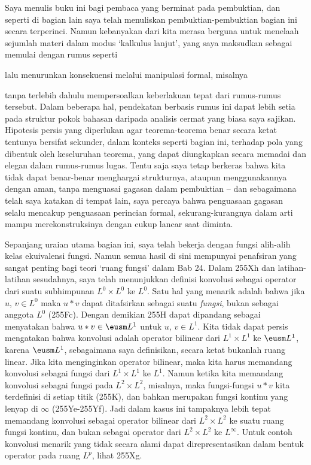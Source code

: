 {Saya menulis buku ini bagi pembaca yang berminat pada pembuktian, dan seperti
di bagian lain saya telah menuliskan pembuktian-pembuktian bagian ini secara terperinci.   Namun
kebanyakan dari kita merasa berguna untuk menelaah sejumlah
materi dalam modus `kalkulus lanjut', yang saya maksudkan sebagai memulai dengan
rumus seperti


\noindent lalu menurunkan konsekuensi melalui manipulasi formal,
misalnya


\noindent tanpa terlebih dahulu mempersoalkan keberlakuan tepat dari
rumus-rumus tersebut.   Dalam beberapa hal, pendekatan berbasis rumus ini dapat
lebih setia pada struktur pokok bahasan daripada analisis cermat yang
biasa saya sajikan.   Hipotesis persis yang diperlukan agar teorema-teorema
benar secara ketat tentunya bersifat sekunder, dalam konteks seperti
bagian ini, terhadap pola yang dibentuk oleh keseluruhan teorema,
yang dapat diungkapkan secara memadai dan elegan dalam rumus-rumus
lugas.   Tentu saja saya tetap berkeras bahwa kita tidak dapat benar-benar
menghargai strukturnya, ataupun menggunakannya dengan aman, tanpa menguasai gagasan
dalam pembuktian -- dan sebagaimana telah saya katakan di tempat lain, saya percaya bahwa penguasaan
gagasan selalu mencakup penguasaan perincian formal, sekurang-kurangnya dalam arti
mampu merekonstruksinya dengan cukup lancar
saat diminta.

Sepanjang uraian utama bagian ini, saya telah bekerja dengan
fungsi alih-alih kelas ekuivalensi fungsi.    Namun semua
hasil di sini mempunyai penafsiran yang sangat penting bagi teori
`ruang fungsi' dalam Bab 24.   Dalam 255Xh dan latihan-latihan
sesudahnya, saya telah menunjukkan definisi konvolusi sebagai operator
dari suatu subhimpunan $L^0\times L^0$ ke $L^0$.
Satu hal yang menarik
adalah bahwa jika $u$, $v\in L^0$ maka $u*v$ dapat ditafsirkan sebagai
suatu {\it fungsi}, bukan sebagai anggota $L^0$ (255Fc).
Dengan demikian 255H dapat dipandang sebagai menyatakan bahwa $u*v\in\eusm L^1$
untuk $u$, $v\in L^1$.   Kita tidak dapat persis mengatakan bahwa konvolusi adalah
operator bilinear dari $L^1\times L^1$ ke $\eusm L^1$, karena $\eusm L^1$,
sebagaimana saya definisikan,
secara ketat bukanlah ruang linear.   Jika kita menginginkan operator bilinear,
maka kita harus memandang konvolusi sebagai fungsi dari
$L^1\times L^1$ ke $L^1$.   Namun ketika kita memandang konvolusi sebagai
fungsi pada $L^2\times L^2$, misalnya, maka fungsi-fungsi $u*v$ kita
terdefinisi di setiap titik (255K), dan bahkan merupakan fungsi kontinu yang lenyap
di $\infty$ (255Ye-255Yf).   Jadi dalam kasus ini tampaknya lebih tepat
memandang konvolusi sebagai operator bilinear dari $L^2\times L^2$ ke
suatu ruang fungsi kontinu, dan bukan sebagai operator dari
$L^2\times L^2$ ke $L^{\infty}$.   Untuk contoh konvolusi menarik
yang tidak secara alami dapat direpresentasikan dalam bentuk operator
pada ruang $L^p$, lihat 255Xg.

}
